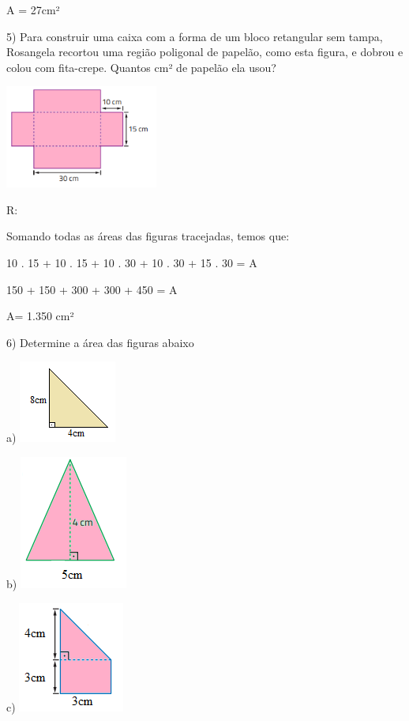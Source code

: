 A = 27cm²

5) Para construir uma caixa com a forma de um bloco retangular sem
tampa, Rosangela recortou uma região poligonal de papelão, como esta
figura, e dobrou e colou com fita-crepe. Quantos cm² de papelão ela
usou?

\includegraphics[width=1.98333in,height=1.33255in]{./imgSAEB_8_MAT/media/image45.png}

R:

Somando todas as áreas das figuras tracejadas, temos que:

10 . 15 + 10 . 15 + 10 . 30 + 10 . 30 + 15 . 30 = A

150 + 150 + 300 + 300 + 450 = A

A= 1.350 cm²

6) Determine a área das figuras abaixo

a)
\includegraphics[width=1.26042in,height=1.0625in]{./imgSAEB_8_MAT/media/image46.png}

b)
\includegraphics[width=1.39583in,height=1.72917in]{./imgSAEB_8_MAT/media/image47.png}

c)
\includegraphics[width=1.375in,height=1.42708in]{./imgSAEB_8_MAT/media/image48.png}

